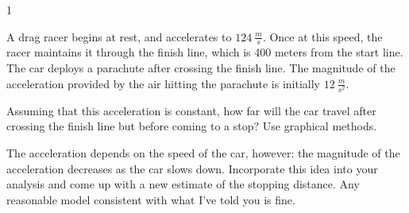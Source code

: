 
\AddToShipoutPicture*{\BackgroundPic}

\addtocounter {ProbNum} {1}

 
{\bf \Large{}} A drag racer begins at rest, and accelerates to ${124~\tfrac{m}{s}}$.  Once at this speed, the racer maintains it through the finish line, which is 400 meters from the start line. The car deploys a parachute after crossing the finish line.  The magnitude of the acceleration provided by the air hitting the parachute is initially ${12~\tfrac{m}{s^2}}$.
\bigskip

Assuming that this acceleration is constant, how far will the car travel after crossing the finish line but before coming to a stop? Use graphical methods.
\vfill

The acceleration depends on the speed of the car, however: the magnitude of the acceleration decreases as the car slows down.  Incorporate this idea into your analysis and come up with a new estimate of the stopping distance.  Any reasonable model consistent with what I've told you is fine.
\vfill


\newpage